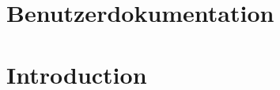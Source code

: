 \documentclass{article}
\begin{document}

\cite{Ries1522Rad}

\newpage
\nocite{}





\appendix

\section{Benutzerdokumentation}
\label{app1}
\section{Introduction}
\end{document}
